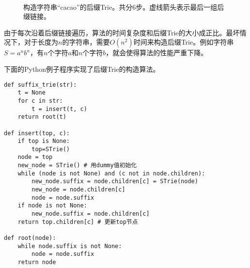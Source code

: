 \documentclass[UTF8]{article}
\begin{document}
\begin{figure}[htbp]
  \centering
   \\
  \caption{构造字符串“cacao”的后缀Trie。共分6步。虚线箭头表示最后一组后缀链接。}
  \label{fig:cons-strie-cacao}
\end{figure}

由于每次沿着后缀链接遍历，算法的时间复杂度和后缀Trie的大小成正比。最坏情况下，对于长度为$n$的字符串，需要$O(n^2)$时间来构造后缀Trie。例如字符串$S=a^nb^n$，有$n$个字符$a$和$n$个字符$b$，就会使得算法的性能严重下降。

下面的Python例子程序实现了后缀Trie的构造算法。

\lstset{language=Python}
\begin{lstlisting}
def suffix_trie(str):
    t = None
    for c in str:
        t = insert(t, c)
    return root(t)

def insert(top, c):
    if top is None:
        top=STrie()
    node = top
    new_node = STrie() # 用dummy值初始化
    while (node is not None) and (c not in node.children):
        new_node.suffix = node.children[c] = STrie(node)
        new_node = node.children[c]
        node = node.suffix
    if node is not None:
        new_node.suffix = node.children[c]
    return top.children[c] # 更新top节点

def root(node):
    while node.suffix is not None:
        node = node.suffix
    return node
\end{lstlisting}
\end{document}
